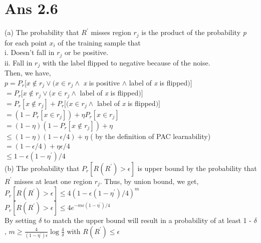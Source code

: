 \documentclass[10pt]{article}
\begin{document}
\section*{Ans 2.6}
\begin{flushleft}
(a) The probability that $R^{'}$ misses region $r_{j}$ is the product of the probability \textit{p} for each point $x_{i}$ of the training sample that \\
i. Doesn't fall in $r_{j}$ or be positive.\\
ii. Fall in $r_{j}$ with the label flipped to negative because of the noise.\\
Then, we have, \\
\hspace{2em} $p = P_{r}[x \not\in r_{j} \lor (x \in r_{j} \land $ \textit{x} is positive $\land$ label of \textit{x} is flipped$)]$\\
\hspace{2.8em} $= P_{r}[x \not\in r_{j} \lor (x \in r_{j} \land $ label of \textit{x} is flipped$)]$\\
\hspace{2.8em} $= P_{r}[x \not\in r_{j}] + P_{r}[(x \in r_{j} \land$ label of \textit{x} is flipped$)]$\\
\hspace{2.8em} $= (1 - P_{r}[x \in r_{j}]) + \eta P_{r}[x \in r_{j}]$\\
\hspace{2.8em} $= (1- \eta) (1- P_{r}[x \not\in r_{j}]) + \eta$\\
\hspace{2.8em} $\leq (1- \eta) (1- \epsilon/4) + \eta$ ( by the definition of PAC learnability)\\
\hspace{2.8em} $= (1- \epsilon/4) + \eta \epsilon/4$\\
\hspace{2.8em} $\leq 1- \epsilon(1 - \eta^{'})/4$\\
\vspace{0.5em}
(b) The probability that $P_{r}[R(R^{'})> \epsilon]$ is upper bound by the probability that $R^{'}$ misses at least one region $r_{j}$. Thus, by union bound, we get, \\
\hspace{2em} $P_{r}[R(R^{'}) > \epsilon ] \leq 4 (1- \epsilon(1 - \eta^{'})/4)^{m}$\\
\hspace{2em} $P_{r}[R(R^{'}) > \epsilon ] \leq 4 e^{-m \epsilon(1 - \eta^{'})/4}$\\
\vspace{0.5em}
By setting $\delta$ to match the upper bound will result in a probability of at least 1 - $\delta$, $m \geq \frac{4}{(1- \eta^{'}) \epsilon} \log \frac{4}{\delta}$ with $R(R^{'}) \leq \epsilon$ 
\end{flushleft}
\end{document}
